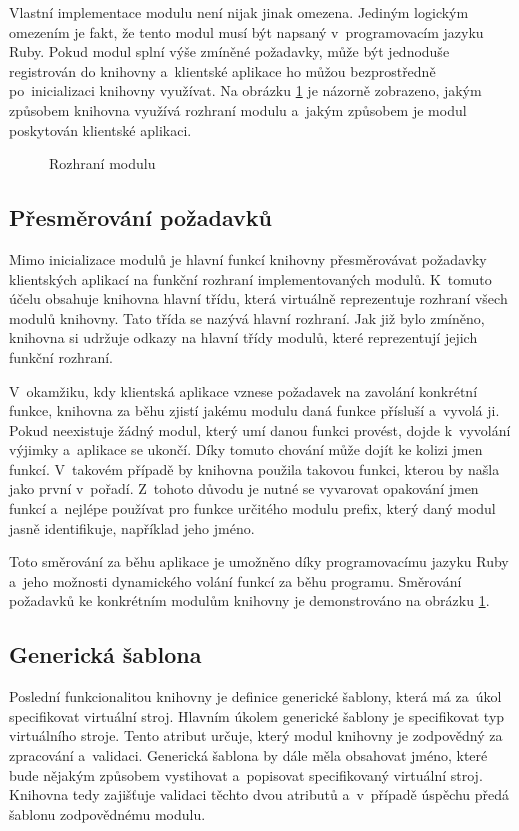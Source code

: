 Vlastní implementace modulu není nijak jinak omezena. Jediným logickým omezením je fakt, že tento modul musí být napsaný
v~programovacím jazyku Ruby. Pokud modul splní výše zmíněné požadavky, může být jednoduše registrován do knihovny a~klientské
aplikace ho můžou bezprostředně po~inicializaci knihovny využívat. Na obrázku \ref{figure:module:interface} je názorně zobrazeno, 
jakým způsobem knihovna využívá rozhraní modulu a~jakým způsobem je modul poskytován klientské aplikaci.
\begin{figure}
    \centering    
    \caption{Rozhraní modulu}
    \label{figure:module:interface}
\end{figure}
\subsection{Přesměrování požadavků}
\label{chapter:implementation:library:routing}
Mimo inicializace modulů je hlavní funkcí knihovny přesměrovávat požadavky klientských aplikací na funkční rozhraní 
implementovaných modulů. K~tomuto účelu obsahuje knihovna hlavní třídu, která virtuálně reprezentuje rozhraní všech modulů
knihovny. Tato třída se nazývá hlavní rozhraní. Jak již bylo zmíněno,
knihovna si udržuje odkazy na hlavní třídy modulů, které reprezentují jejich funkční rozhraní.

V~okamžiku, kdy klientská aplikace vznese požadavek na zavolání konkrétní funkce, knihovna za běhu zjistí jakému modulu daná
funkce přísluší a~vyvolá ji. Pokud neexistuje žádný modul, který umí danou funkci provést, dojde k~vyvolání výjimky a~aplikace
se ukončí. Díky tomuto chování může dojít ke kolizi jmen funkcí. V~takovém případě by knihovna použila takovou funkci, kterou
by našla jako první v~pořadí. Z~tohoto důvodu je nutné se vyvarovat opakování jmen funkcí a~nejlépe používat pro funkce určitého
modulu prefix, který daný modul jasně identifikuje, například jeho jméno.

Toto směrování za běhu aplikace je umožněno díky programovacímu jazyku Ruby a~jeho možnosti dynamického volání funkcí za běhu
programu. Směrování požadavků ke konkrétním modulům knihovny je demonstrováno na obrázku \ref{figure:module:interface}.
\subsection{Generická šablona}
\label{chapter:implementation:library:generic}
Poslední funkcionalitou knihovny je definice generické šablony, která má za~úkol specifikovat virtuální stroj. Hlavním úkolem
generické šablony je specifikovat typ virtuálního stroje. Tento atribut určuje, který modul knihovny je zodpovědný
za zpracování a~validaci. Generická šablona by dále měla obsahovat jméno, které bude nějakým způsobem vystihovat a~popisovat
specifikovaný virtuální stroj. Knihovna tedy zajišťuje validaci těchto dvou atributů a~v~případě úspěchu předá
šablonu zodpovědnému modulu.

